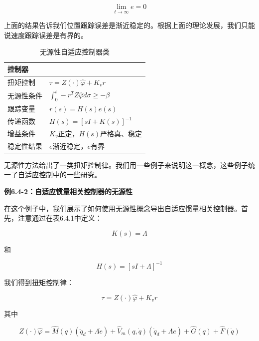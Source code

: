 \documentclass[12pt,a4paper]{ctexart}
\begin{document}
\begin{equation}\label{eq:e-converge}
\lim_{t \to \infty} e = 0
\end{equation}

上面的结果告诉我们位置跟踪误差是渐近稳定的。根据上面的理论发展，我们只能说速度跟踪误差是有界的。

\begin{table}[H]
\centering
\caption{无源性自适应控制器类}
\begin{tabular}{|l|l|}
\hline
\textbf{控制器} & \\ \hline
扭矩控制 & $\tau = Z(\cdot)\hat{\varphi} + K_v r$ \\ \hline
无源性条件 & $\int_0^t -r^T Z \hat{\varphi} d\sigma \geq -\beta$ \\ \hline
跟踪变量 & $r(s) = H(s)e(s)$ \\ \hline
传递函数 & $H(s) = [sI + K(s)]^{-1}$ \\ \hline
增益条件 & $K_v$正定，$H(s)$严格真、稳定 \\ \hline
稳定性结果 & $e$渐近稳定，$\dot{e}$有界 \\ \hline
\end{tabular}
\end{table}

无源性方法给出了一类扭矩控制律。我们用一些例子来说明这一概念，这些例子统一了自适应控制中的一些研究。

\textbf{例6.4-2：自适应惯量相关控制器的无源性}

在这个例子中，我们展示了如何使用无源性概念导出自适应惯量相关控制器。首先，注意通过在表6.4.1中定义：

\begin{equation}
K(s) = \Lambda
\end{equation}

和

\begin{equation}
H(s) = [sI + \Lambda]^{-1}
\end{equation}

我们得到扭矩控制律：

\begin{equation}
\tau = Z(\cdot)\hat{\varphi} + K_v r
\end{equation}

其中

\begin{equation}
Z(\cdot)\hat{\varphi} = \hat{M}(q)(\ddot{q}_d + \Lambda \dot{e}) + \hat{V}_m(q, \dot{q})(\dot{q}_d + \Lambda e) + \hat{G}(q) + \hat{F}(\dot{q})
\end{equation}
\end{document}
